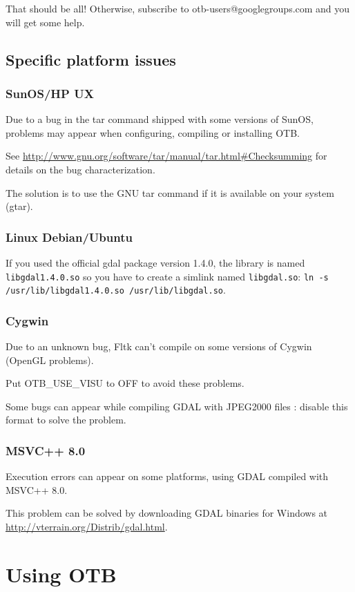 That should be all! Otherwise, subscribe to
   otb-users@googlegroups.com and you will get some help.

\subsection{Specific platform issues}
\subsubsection{SunOS/HP UX}
Due to a bug in the tar command shipped with some versions of SunOS,
problems may appear when configuring, compiling or installing OTB.

See \url{http://www.gnu.org/software/tar/manual/tar.html#Checksumming} for
details on the bug characterization.

The solution is to use the GNU tar command if it is available on your
system (gtar).

\subsubsection{Linux Debian/Ubuntu}
If you used the official gdal package version 1.4.0, the library is named 
\texttt{libgdal1.4.0.so} so you have to create a simlink named 
\texttt{libgdal.so}: \texttt{ln -s /usr/lib/libgdal1.4.0.so /usr/lib/libgdal.so}.

\subsubsection{Cygwin}
Due to an unknown bug, Fltk can't compile on some versions of Cygwin (OpenGL problems).

Put OTB\_USE\_VISU to OFF to avoid these problems.

Some bugs can appear while compiling GDAL with JPEG2000 files : disable this format to solve the problem.

\subsubsection{MSVC++ 8.0}
Execution errors can appear on some platforms, using GDAL compiled with MSVC++ 8.0.

This problem can be solved by downloading GDAL binaries for Windows
at \url{http://vterrain.org/Distrib/gdal.html}.

\section{Using OTB}


